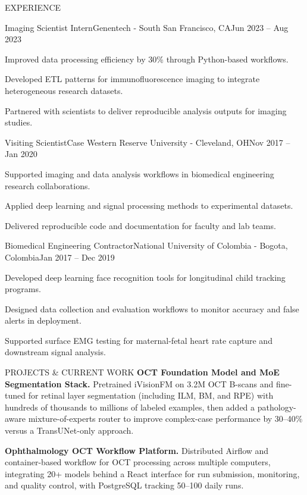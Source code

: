 \documentclass{resume} %
\begin{document}
\begin{rSection}{EXPERIENCE}
  \begin{rWork}{Imaging Scientist Intern}{Genentech - South San Francisco, CA}{Jun 2023 -- Aug 2023}
    \item Improved data processing efficiency by 30\% through Python-based workflows.
    \item Developed ETL patterns for immunofluorescence imaging to integrate heterogeneous research datasets.
    \item Partnered with scientists to deliver reproducible analysis outputs for imaging studies.
  \end{rWork}

  \begin{rWork}{Visiting Scientist}{Case Western Reserve University - Cleveland, OH}{Nov 2017 -- Jan 2020}
    \item Supported imaging and data analysis workflows in biomedical engineering research collaborations.
    \item Applied deep learning and signal processing methods to experimental datasets.
    \item Delivered reproducible code and documentation for faculty and lab teams.
  \end{rWork}

  \begin{rWork}{Biomedical Engineering Contractor}{National University of Colombia - Bogota, Colombia}{Jan 2017 -- Dec 2019}
    \item Developed deep learning face recognition tools for longitudinal child tracking programs.
    \item Designed data collection and evaluation workflows to monitor accuracy and false alerts in deployment.
    \item Supported surface EMG testing for maternal-fetal heart rate capture and downstream signal analysis.
  \end{rWork}

\end{rSection}
\begin{rSection}{PROJECTS \& CURRENT WORK}
\textbf{OCT Foundation Model and MoE Segmentation Stack.} Pretrained iVisionFM on 3.2M OCT B-scans and fine-tuned for retinal layer segmentation (including ILM, BM, and RPE) with hundreds of thousands to millions of labeled examples, then added a pathology-aware mixture-of-experts router to improve complex-case performance by 30--40\% versus a TransUNet-only approach.

\vspace{2mm}

\textbf{Ophthalmology OCT Workflow Platform.} Distributed Airflow and container-based workflow for OCT processing across multiple computers, integrating 20+ models behind a React interface for run submission, monitoring, and quality control, with PostgreSQL tracking 50--100 daily runs.
\end{rSection}
\end{document}
